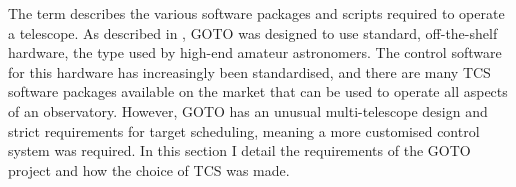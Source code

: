 
\begin{colsection}

The term  describes the various software packages and scripts required to operate a telescope. As described in , GOTO was designed to use standard, off-the-shelf hardware, the type used by high-end amateur astronomers. The control software for this hardware has increasingly been standardised, and there are many TCS software packages available on the market that can be used to operate all aspects of an observatory. However, GOTO has an unusual multi-telescope design and strict requirements for target scheduling, meaning a more customised control system was required. In this section I detail the requirements of the GOTO project and how the choice of TCS was made.

\end{colsection}


